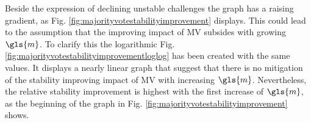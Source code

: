 Beside the expression of declining unstable challenges the graph has a raising gradient, as Fig. \ref{fig:majorityvotestabilityimprovement} displays.
This could lead to the assumption that the improving impact of \ac{MV} subsides with growing $\gls{m}$.
To clarify this the logarithmic Fig. \ref{fig:majorityvotestabilityimprovementloglog} has been created with the same values.
It displays a nearly linear graph that suggest that there is no mitigation of the stability improving impact of \ac{MV} with increasing $\gls{m}$.
Nevertheless, the relative stability improvement is highest with the first increase of $\gls{m}$, as the beginning of the graph in Fig.  \ref{fig:majorityvotestabilityimprovement} shows.


